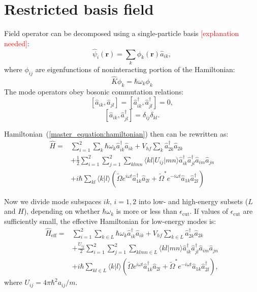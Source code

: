\documentclass[12pt,notitlepage]{report}
\begin{document}
\section{Restricted basis field}

Field operator can be decomposed using a single-particle basis \textcolor{red}{[explanation needed]}:
\[ \hat{\psi}_i(\mathbf{r}) = \sum\limits_k \phi_{k}(\mathbf{r}) \hat{a}_{ik}, \]
where $\phi_{ij}$ are eigenfunctions of noninteracting portion of the Hamiltonian:
\[ \hat{K} \phi_{k} = \hbar \omega_{k} \phi_{k} \]
The mode operators obey bosonic commutation relations:
\[ [ \hat{a}_{ik}, \hat{a}_{jl} ] = [ \hat{a}_{ik}^\dagger, \hat{a}_{jl}^\dagger ] = 0, \]
\[ [ \hat{a}_{ik}, \hat{a}_{jl}^\dagger ] = \delta_{ij} \delta_{kl} . \]

Hamiltonian~(\ref{master_equation:hamiltonian}) then can be rewritten as:
\begin{equation*}
\begin{split}
\hat{H} = &
	\sum\limits_{i=1}^2 \sum\limits_k \hbar \omega_{k} \hat{a}_{ik}^\dagger \hat{a}_{ik} +
	V_{hf} \sum\limits_k \hat{a}_{2k}^\dagger \hat{a}_{2k} \\
	& + \frac{1}{2} \sum\limits_{i=1}^2 \sum\limits_{j=1}^2 \sum\limits_{klmn}
		\langle kl \lvert U_{ij} \rvert mn \rangle
		\hat{a}_{ik}^\dagger \hat{a}_{jl}^\dagger \hat{a}_{im} \hat{a}_{jn} \\
	& + i \hbar \sum\limits_{kl} \langle k \vert l \rangle \left(
		\tilde{\Omega} e^{i \omega t} \hat{a}_{1k}^\dagger \hat{a}_{2l} +
		\tilde{\Omega}^* e^{-i \omega t} \hat{a}_{1k} \hat{a}_{2l}^\dagger
	\right)
\end{split}
\end{equation*}

Now we divide mode subspaces $ik,\,i=1,2$ into low- and high-energy subsets ($L$ and $H$),
depending on whether $\hbar \omega_{k}$ is more or less than $\epsilon_{\textrm{cut}}$.
If values of $\epsilon_{\textrm{cut}}$ are sufficiently small, the effective Hamiltonian for low-energy modes is:
\begin{equation*}
\begin{split}
\hat{H}_{\textrm{eff}} = &
	\sum\limits_{i=1}^2 \sum\limits_{k \in L} \hbar \omega_{k} \hat{a}_{ik}^\dagger \hat{a}_{ik} +
	V_{hf} \sum\limits_{k \in L} \hat{a}_{2k}^\dagger \hat{a}_{2k} \\
	& + \frac{U_{ij}}{2} \sum\limits_{i=1}^2 \sum\limits_{j=1}^2 \sum\limits_{klmn \in L}
		\langle kl \vert mn \rangle
		\hat{a}_{ik}^\dagger \hat{a}_{jl}^\dagger \hat{a}_{im} \hat{a}_{jn} \\
	& + i \hbar \sum\limits_{kl \in L} \langle k \vert l \rangle \left(
		\tilde{\Omega} e^{i \omega t} \hat{a}_{1k}^\dagger \hat{a}_{2l} +
		\tilde{\Omega}^* e^{-i \omega t} \hat{a}_{1k} \hat{a}_{2l}^\dagger
	\right),
\end{split}
\end{equation*}
where $U_{ij} = 4 \pi \hbar^2 a_{ij} / m$.
\end{document}

